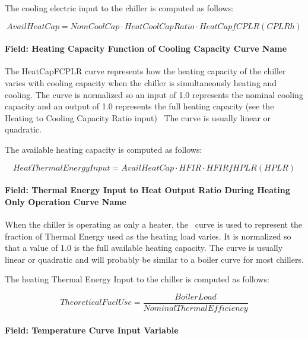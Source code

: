 The cooling electric input to the chiller is computed as follows:

\begin{equation}
AvailHeatCap = NomCoolCap \cdot HeatCoolCapRatio \cdot HeatCapfCPLR(CPLRh)
\end{equation}

\paragraph{Field: Heating Capacity Function of Cooling Capacity Curve Name}\label{field-heating-capacity-function-of-cooling-capacity-curve-name-1}

The HeatCapFCPLR curve represents how the heating capacity of the chiller varies with cooling capacity when the chiller is simultaneously heating and cooling. The curve is normalized so an input of 1.0 represents the nominal cooling capacity and an output of 1.0 represents the full heating capacity (see the Heating to Cooling Capacity Ratio input)~ The curve is usually linear or quadratic.

The available heating capacity is computed as follows:

\begin{equation}
HeatThermalEnergyInput = AvailHeatCap \cdot HFIR \cdot HFIRfHPLR(HPLR)
\end{equation}

\paragraph{Field: Thermal Energy Input to Heat Output Ratio During Heating Only Operation Curve Name}\label{field-thermal-energy-input-to-heat-output-ratio-during-heating-only-operation-curve-name}

When the chiller is operating as only a heater, the~ curve is used to represent the fraction of Thermal Energy used as the heating load varies. It is normalized so that a value of 1.0 is the full available heating capacity. The curve is usually linear or quadratic and will probably be similar to a boiler curve for most chillers.

The heating Thermal Energy Input to the chiller is computed as follows:

\begin{equation}
TheoreticalFuelUse = \frac{{BoilerLoad}}{{NominalThermalEfficiency}}
\end{equation}

\paragraph{Field: Temperature Curve Input Variable}\label{field-temperature-curve-input-variable-1}

